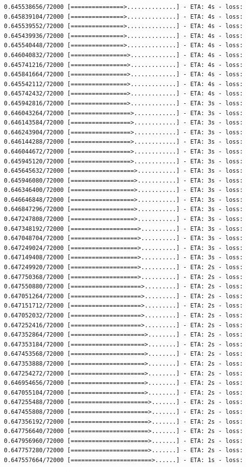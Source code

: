 \documentclass[12pt,fleqn]{article}\usepackage{../../common}
\begin{document}
\begin{verbatim}
0.645538656/72000 [===============>..............] - ETA: 4s - loss: 0.645839104/72000 [===============>..............] - ETA: 4s - loss: 0.645539552/72000 [===============>..............] - ETA: 4s - loss: 0.645439936/72000 [===============>..............] - ETA: 4s - loss: 0.645540448/72000 [===============>..............] - ETA: 4s - loss: 0.646040832/72000 [================>.............] - ETA: 4s - loss: 0.645741216/72000 [================>.............] - ETA: 4s - loss: 0.645841664/72000 [================>.............] - ETA: 4s - loss: 0.645542112/72000 [================>.............] - ETA: 4s - loss: 0.645742432/72000 [================>.............] - ETA: 4s - loss: 0.645942816/72000 [================>.............] - ETA: 3s - loss: 0.646043264/72000 [=================>............] - ETA: 3s - loss: 0.646143584/72000 [=================>............] - ETA: 3s - loss: 0.646243904/72000 [=================>............] - ETA: 3s - loss: 0.646144288/72000 [=================>............] - ETA: 3s - loss: 0.646044672/72000 [=================>............] - ETA: 3s - loss: 0.645945120/72000 [=================>............] - ETA: 3s - loss: 0.645645632/72000 [==================>...........] - ETA: 3s - loss: 0.645946080/72000 [==================>...........] - ETA: 3s - loss: 0.646346400/72000 [==================>...........] - ETA: 3s - loss: 0.646646848/72000 [==================>...........] - ETA: 3s - loss: 0.646847296/72000 [==================>...........] - ETA: 3s - loss: 0.647247808/72000 [==================>...........] - ETA: 3s - loss: 0.647348192/72000 [===================>..........] - ETA: 3s - loss: 0.647048704/72000 [===================>..........] - ETA: 3s - loss: 0.647249024/72000 [===================>..........] - ETA: 3s - loss: 0.647149408/72000 [===================>..........] - ETA: 3s - loss: 0.647249920/72000 [===================>..........] - ETA: 2s - loss: 0.647750368/72000 [===================>..........] - ETA: 2s - loss: 0.647550880/72000 [====================>.........] - ETA: 2s - loss: 0.647051264/72000 [====================>.........] - ETA: 2s - loss: 0.647151712/72000 [====================>.........] - ETA: 2s - loss: 0.647052032/72000 [====================>.........] - ETA: 2s - loss: 0.647252416/72000 [====================>.........] - ETA: 2s - loss: 0.647352864/72000 [=====================>........] - ETA: 2s - loss: 0.647353184/72000 [=====================>........] - ETA: 2s - loss: 0.647453568/72000 [=====================>........] - ETA: 2s - loss: 0.647353888/72000 [=====================>........] - ETA: 2s - loss: 0.647254272/72000 [=====================>........] - ETA: 2s - loss: 0.646954656/72000 [=====================>........] - ETA: 2s - loss: 0.647055104/72000 [=====================>........] - ETA: 2s - loss: 0.647255488/72000 [======================>.......] - ETA: 2s - loss: 0.647455808/72000 [======================>.......] - ETA: 2s - loss: 0.647356192/72000 [======================>.......] - ETA: 2s - loss: 0.647756640/72000 [======================>.......] - ETA: 2s - loss: 0.647956960/72000 [======================>.......] - ETA: 2s - loss: 0.647757280/72000 [======================>.......] - ETA: 2s - loss: 0.647557664/72000 [=======================>......] - ETA: 1s - loss: 
\end{verbatim}
\end{document}

